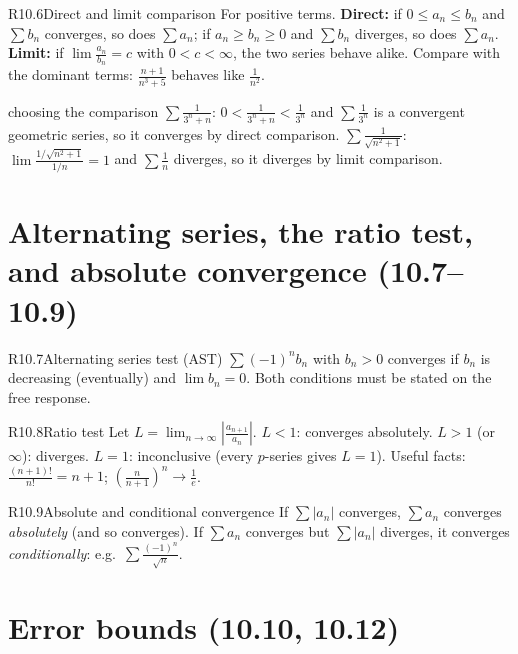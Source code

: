 \documentclass{apcalc}
\begin{document}
\begin{rulebox}{R10.6}{Direct and limit comparison}
For positive terms. \textbf{Direct:} if $0\le a_n\le b_n$ and $\sum b_n$ converges, so does $\sum a_n$; if $a_n\ge b_n\ge0$ and $\sum b_n$ diverges, so does $\sum a_n$. \textbf{Limit:} if $\lim\frac{a_n}{b_n}=c$ with $0<c<\infty$, the two series behave alike. Compare with the dominant terms: $\frac{n+1}{n^3+5}$ behaves like $\frac{1}{n^2}$.
\end{rulebox}

\begin{example}{choosing the comparison}
$\sum\frac{1}{3^n+n}$: $0<\frac{1}{3^n+n}<\frac{1}{3^n}$ and $\sum\frac{1}{3^n}$ is a convergent geometric series, so it converges by direct comparison. $\sum\frac{1}{\sqrt{n^2+1}}$: $\lim\frac{1/\sqrt{n^2+1}}{1/n}=1$ and $\sum\frac1n$ diverges, so it diverges by limit comparison.
\end{example}

\section{Alternating series, the ratio test, and absolute convergence (10.7--10.9)}

\begin{rulebox}{R10.7}{Alternating series test (AST)}
$\sum(-1)^nb_n$ with $b_n>0$ converges if $b_n$ is decreasing (eventually) and $\lim b_n=0$. Both conditions must be stated on the free response.
\end{rulebox}

\begin{rulebox}{R10.8}{Ratio test}
Let $L=\lim_{n\to\infty}\left|\frac{a_{n+1}}{a_n}\right|$. $L<1$: converges absolutely. $L>1$ (or $\infty$): diverges. $L=1$: inconclusive (every $p$-series gives $L=1$). Useful facts: $\frac{(n+1)!}{n!}=n+1$; $\left(\frac{n}{n+1}\right)^n\to\frac1e$.
\end{rulebox}

\begin{rulebox}{R10.9}{Absolute and conditional convergence}
If $\sum|a_n|$ converges, $\sum a_n$ converges \emph{absolutely} (and so converges). If $\sum a_n$ converges but $\sum|a_n|$ diverges, it converges \emph{conditionally}: e.g.\ $\sum\frac{(-1)^n}{\sqrt n}$.
\end{rulebox}

\section{Error bounds (10.10, 10.12)}
\end{document}
